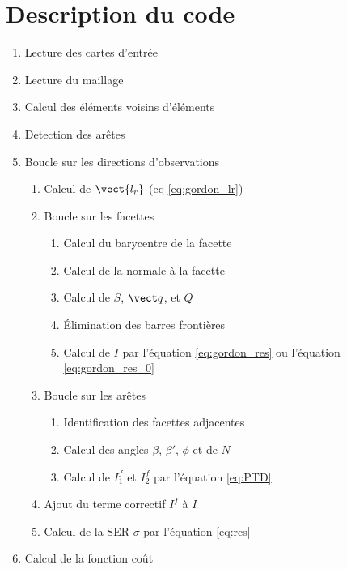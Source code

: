 \section{Description du code}
\label{sec:code}
\begin{enumerate}
	\item Lecture des cartes d'entrée
	\item Lecture du maillage
	\item Calcul des éléments voisins d'éléments
	\item Detection des arêtes %
	\item Boucle sur les directions d'observations
	\begin{enumerate}
		\item Calcul de $\vect{l_r}$ (eq \eqref{eq:gordon_lr})
		\item Boucle sur les facettes
		\begin{enumerate}
			\item Calcul du barycentre de la facette
			\item Calcul de la normale à la facette
			\item Calcul de $S$, $\vect q$, et $Q$
			\item \'Elimination des barres frontières
			\item Calcul de $I$ par l'équation \eqref{eq:gordon_res} ou l'équation \eqref{eq:gordon_res_0}
		\end{enumerate}
		\item Boucle sur les arêtes
		\begin{enumerate}
			\item Identification des facettes adjacentes
			\item Calcul des angles $\beta$, $\beta'$, $\phi$ et de $N$
			\item Calcul de $I^f_1$ et $I^f_2$ par l'équation \eqref{eq:PTD}
		\end{enumerate}
		\item Ajout du terme correctif $I^f$ à $I$
		\item Calcul de la SER $\sigma$ par l'équation \eqref{eq:rcs}
	\end{enumerate}
	\item Calcul de la fonction coût %
\end{enumerate}





\printbibliography[heading=subbibintoc]